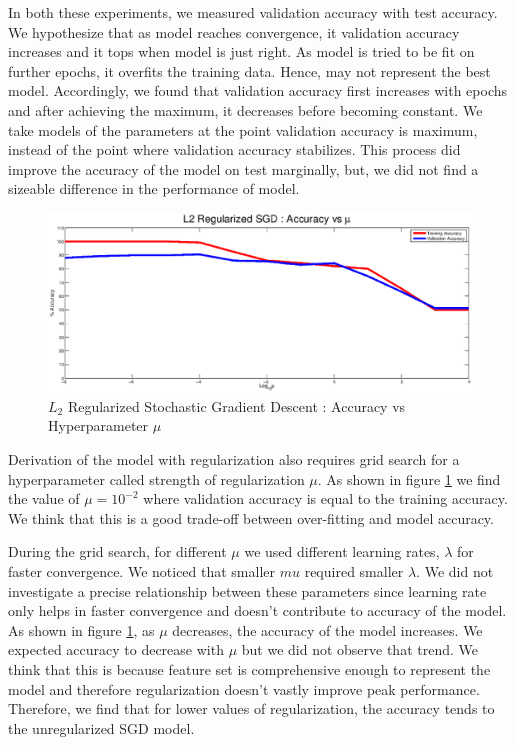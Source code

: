 \documentclass{acm_proc_article-sp}
\begin{document}
In both these experiments, we measured validation accuracy with test accuracy. We hypothesize that as model reaches convergence, it validation accuracy increases and it tops when model is just right. As model is tried to be fit on further epochs, it overfits the training data. Hence, may not represent the best model. Accordingly, we found that validation accuracy first increases with epochs and after achieving the maximum, it decreases before becoming constant. We take models of the parameters at the point validation accuracy is maximum, instead of the point where validation accuracy stabilizes. This process did improve the accuracy of the model on test marginally, but, we did not find a sizeable difference in the performance of model.

\begin{figure}\label{accuracy_vs_mu_l2_regularized}
\centering
\includegraphics[scale=0.25]{accuracy_vs_mu_l2_regularized.eps}
\caption{$L_{2}$ Regularized Stochastic Gradient Descent : Accuracy vs Hyperparameter $\mu$}
\end{figure}

Derivation of the model with regularization also requires grid search for a hyperparameter called strength of regularization $\mu$. As shown in figure \ref{accuracy_vs_mu_l2_regularized} we find the value of $\mu=10^{-2}$ where validation accuracy is equal to the training accuracy. We think that this is a good trade-off between over-fitting and model accuracy.

During the grid search, for different $\mu$ we used different learning rates, $\lambda$ for faster convergence. We noticed that smaller $mu$ required smaller $\lambda$. We did not investigate a precise relationship between these parameters since learning rate only helps in faster convergence and doesn't contribute to accuracy of the model. As shown in figure \ref{accuracy_vs_mu_l2_regularized}, as $\mu$ decreases, the accuracy of the model increases. We expected accuracy to decrease with $\mu$ but we did not observe that trend. We think that this is because feature set is comprehensive enough to represent the model and therefore regularization doesn't vastly improve peak performance. Therefore, we find that for lower values of regularization, the accuracy tends to the unregularized SGD model.
\end{document}

